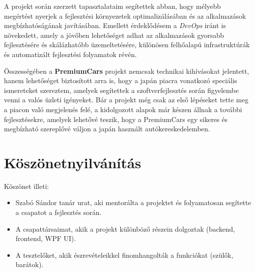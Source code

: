 \documentclass{report}[11pt]
\begin{document}
A projekt során szerzett tapasztalataim segítettek abban, hogy mélyebb megértést nyerjek a fejlesztési környezetek optimalizálásában és az alkalmazások megbízhatóságának javításában. Emellett érdeklődésem a \textit{DevOps} iránt is növekedett, amely a jövőben lehetőséget adhat az alkalmazások gyorsabb fejlesztésére és skálázhatóbb üzemeltetésére, különösen felhőalapú infrastruktúrák és automatizált fejlesztési folyamatok révén.

Összességében a \textbf{PremiumCars} projekt nemcsak technikai kihívásokat jelentett, hanem lehetőséget biztosított arra is, hogy a japán piacra vonatkozó speciális ismereteket szereztem, amelyek segítettek a szoftverfejlesztés során figyelembe venni a valós üzleti igényeket. Bár a projekt még csak az első lépéseket tette meg a piacon való megjelenés felé, a kidolgozott alapok már készen állnak a további fejlesztésekre, amelyek lehetővé teszik, hogy a PremiumCars egy sikeres és megbízható szereplővé váljon a japán használt autókereskedelemben.

\section{Köszönetnyilvánítás}
Köszönet illeti:
\begin{itemize}
    \item Szabó Sándor tanár urat, aki mentorálta a projektet és folyamatosan segítette a csapatot a fejlesztés során.
    \item A csapattársaimat, akik a projekt különböző részein dolgoztak (backend, frontend, WPF UI).
    \item A tesztelőket, akik észrevételeikkel finomhangolták a funkciókat (szülők, barátok).
\end{itemize}
\end{document}
